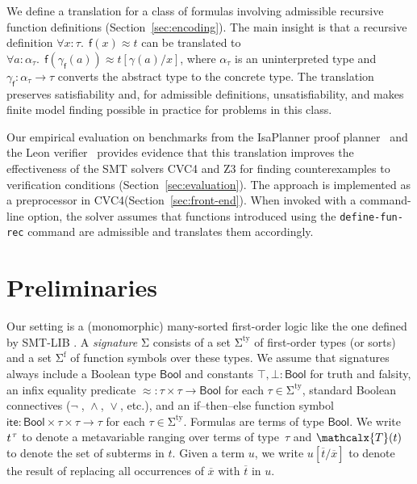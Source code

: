 \documentclass[runningheads,a4paper]{llncs}
\newcommand{\con}[1]{\mathsf{#1}}
\let\const=\con
\renewcommand\vec[1]{\overline{#1}}
\let\oldSigma=\Sigma
\def\Sigma{\mathrm{\oldSigma}}
\let\oldneg=\neg
\def\neg{\oldneg\;}
\let\oldvee=\vee
\def\vee{\mathrel{\oldvee}}
\let\oldwedge=\wedge
\def\wedge{\mathrel{\oldwedge}}
\newcommand\cvc{CVC4\xspace}
\newcommand\ziii{Z3\xspace}
\newcommand{\teq}{\approx}
\newcommand{\terms}{\mathcalx{T}}
\newcommand{\stypes}[1]{#1^\mathrm{ty}}
\newcommand{\sfuns}[1]{#1^\mathrm{f}}
\newcommand\ty[1]{\con{#1}}
\newcommand{\Bool}{\ty{Bool}}
\newcommand{\ltrue}{\top}
\newcommand{\lfalse}{\bot}
\newcommand{\lite}{\con{ite}}
\newcommand\concret{\gamma} %
\newcommand{\farg}[1]{\concret_{#1}}
\newcommand{\fargtype}[1]{\alpha_{#1}}
\newcommand{\rem}[1]{\textcolor{red}{[#1]}}
\newcommand{\jb}[1]{\rem{#1 --jb}}
\newcommand{\ct}[1]{\rem{#1 --ct}}
\newcommand{\vthinspace}{\kern+0.083333em}
\newcommand{\typ}[1]{^{\vthinspace #1}}
\begin{document}
We define a translation for a class of
formulas involving admissible recursive function definitions
(Section~\ref{sec:encoding}). The main insight is that a
recursive definition $\forall x : \tau.\;\, \const{f}(x) \teq t$
can be translated to
$\forall a :
\fargtype{\tau}.\;\, \const{f}(\farg{\con{f}}(a)) \teq t[\concret(a)/x]$, where
$\fargtype{\tau}$ is an uninterpreted  type and $\farg{\con{f}} :
\fargtype{\tau} \to \tau$ converts the abstract type to the concrete
type. The translation preserves satisfiability and, for admissible definitions,
unsatisfiability, and makes finite model finding possible in practice
for problems in this class.

Our empirical evaluation on benchmarks from the IsaPlanner proof planner~\cite{DBLP:conf/itp/JohanssonDB10}
and the Leon verifier~\cite{blanc2013overview} provides
evidence that this translation improves the effectiveness of the SMT solvers
\cvc and \ziii for finding counterexamples to verification conditions
(Section~\ref{sec:evaluation}). The approach is implemented as a preprocessor
in \cvc (Section~\ref{sec:front-end}). When invoked with a
command-line option, the solver assumes that functions introduced using the
\texttt{define-fun-rec} command are admissible and translates them accordingly.


\section{Preliminaries}
\label{sec:prelim}

Our setting is a (monomorphic) many-sorted first-order logic
like the one defined by SMT-LIB \cite{smtlib25}.
A \emph{signature} $\Sigma$ consists of
a set $\stypes{\Sigma}$ of %
first-order types
%
(or sorts) and a set $\sfuns{\Sigma}$ of function symbols over these types.
We assume that signatures always include a Boolean type $\Bool$ and constants
$\ltrue, \lfalse : \Bool$ for truth and falsity,
an infix equality predicate ${\teq} : \tau \times \tau \to \Bool$
for each $\tau \in \stypes{\Sigma}$,
standard Boolean connectives ($\neg$, $\wedge$, $\vee$, etc.),
and an if--then--else function symbol
$\lite : \Bool \times \tau \times \tau \rightarrow \tau$
for each $\tau \in \stypes{\Sigma}$.
Formulas are terms of type $\Bool$.
We write $t\typ{\tau}$ to denote a metavariable ranging over terms of
type~$\tau$ and $\terms( t )$ to denote the set of subterms in $t$.
Given a term $u$, we write $u[\vec t/\vec x]$ to denote the result of replacing
all occurrences of $\vec x$ with $\vec t$ in $u$.
\end{document}
